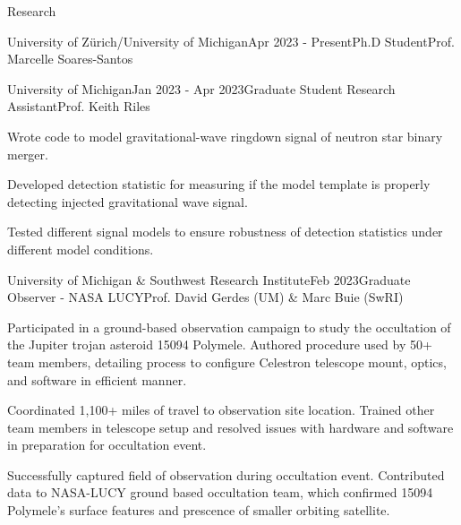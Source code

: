 \documentclass{resume} %
\begin{document}
\begin{rSection}{Research}
\begin{rSubsection}{University of Zürich/University of Michigan}{Apr 2023 - Present}{Ph.D Student}{Prof. Marcelle Soares-Santos}
\begin{rSubsection}{University of Michigan}{Jan 2023 - Apr 2023}{Graduate Student Research Assistant}{Prof. Keith Riles}
    \item Wrote code to model gravitational-wave ringdown signal of neutron star binary merger.
    \item Developed detection statistic for measuring if the model template is properly detecting injected gravitational wave signal. 
    \item Tested different signal models to ensure robustness of detection statistics under different model conditions.
\end{rSubsection}

\newpage

\begin{rSubsection}{University of Michigan \& Southwest Research Institute}{Feb 2023}{Graduate Observer - NASA LUCY}{Prof. David Gerdes (UM) \& Marc Buie (SwRI)}
    \item Participated in a ground-based observation campaign to study the occultation of the Jupiter trojan asteroid 15094 Polymele. Authored procedure used by 50+ team members, detailing process to configure Celestron telescope mount, optics, and software in efficient manner.
    \item Coordinated 1,100+ miles of travel to observation site location. Trained other team members in telescope setup and resolved issues with hardware and software in preparation for occultation event.
    \item Successfully captured field of observation during occultation event. Contributed data to NASA-LUCY ground based occultation team, which confirmed 15094 Polymele's surface features and prescence of smaller orbiting satellite.
\end{rSubsection}




\end{rSubsection}
\end{rSection}
\end{document}
